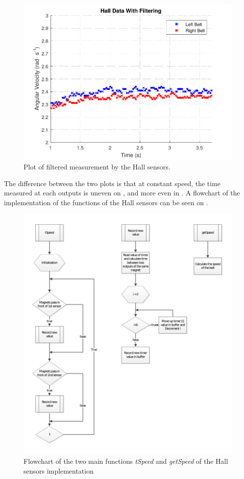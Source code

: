 \begin{figure}[H]
	\centering
	\includegraphics[scale=0.9]{figures/filteredHall.pdf}
	\caption{Plot of filtered measurement by the Hall sensors.}
	\label{filteredHall}
\end{figure}

The difference between the two plots is that at constant speed, the time measured at each outputs is uneven on , and more even in . A flowchart of the implementation of the functions of the Hall sensors can be seen on .

\begin{figure}[H]
	\centering
	\includegraphics[scale=0.9]{figures/hallFlowchart.pdf}
	\caption{Flowchart of the two main functions \textit{tSpeed} and \textit{getSpeed} of the Hall sensors implementation}
	\label{hallFlowchart}
\end{figure}

